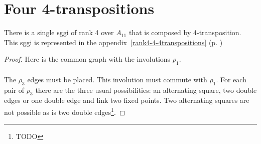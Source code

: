\section{Four 4-transpositions}

\begin{theorem}
  There is a single sggi of rank 4 over $A_{11}$ that is composed by 4-transposition. This sggi is represented in the appendix~\ref{rank4-4-4transpositions} (p. \pageref{rank4-4-4transpositions})
\end{theorem}

\begin{proof}
  Here is the common graph with the involutions $\rho_1$.

  \begin{figure}[H]
    \begin{center}
      \caption{}
    \end{center}
  \end{figure}

  \paragraph{}
  The $\rho_3$ edges must be placed. This involution must commute with $\rho_1$. For each pair of $\rho_3$ there are the three usual possibilities: an alternating square, two double edges or one double edge and link two fixed points. Two alternating squares are not possible as is two double edges\footnote{TODO}.


\end{proof}
